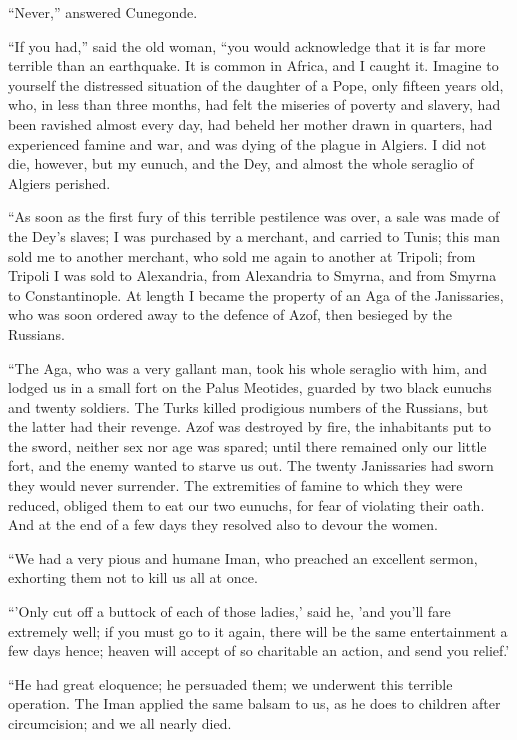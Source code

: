 ``Never,'' answered Cunegonde.

``If you had,'' said the old woman, ``you would acknowledge that it is far more terrible than an earthquake. It is common in Africa, and I caught it. Imagine to yourself the distressed situation of the daughter of a Pope, only fifteen years old, who, in less than three months, had felt the miseries of poverty and slavery, had been ravished almost every day, had beheld her mother drawn in quarters, had experienced famine and war, and was dying of the plague in Algiers. I did not die, however, but my eunuch, and the Dey, and almost the whole seraglio of Algiers perished.

``As soon as the first fury of this terrible pestilence was over, a sale was made of the Dey's slaves; I was purchased by a merchant, and carried to Tunis; this man sold me to another merchant, who sold me again to another at Tripoli; from Tripoli I was sold to Alexandria, from Alexandria to Smyrna, and from Smyrna to Constantinople. At length I became the property of an Aga of the Janissaries, who was soon ordered away to the defence of Azof, then besieged by the Russians.

``The Aga, who was a very gallant man, took his whole seraglio with him, and lodged us in a small fort on the Palus Meotides, guarded by two black eunuchs and twenty soldiers. The Turks killed prodigious numbers of the Russians, but the latter had their revenge. Azof was destroyed by fire, the inhabitants put to the sword, neither sex nor age was spared; until there remained only our little fort, and the enemy wanted to starve us out. The twenty Janissaries had sworn they would never surrender. The extremities of famine to which they were reduced, obliged them to eat our two eunuchs, for fear of violating their oath. And at the end of a few days they resolved also to devour the women.

``We had a very pious and humane Iman, who preached an excellent sermon, exhorting them not to kill us all at once.

``'Only cut off a buttock of each of those ladies,' said he, 'and you'll fare extremely well; if you must go to it again, there will be the same entertainment a few days hence; heaven will accept of so charitable an action, and send you relief.'

``He had great eloquence; he persuaded them; we underwent this terrible operation. The Iman applied the same balsam to us, as he does to children after circumcision; and we all nearly died.

